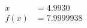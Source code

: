 \documentclass[preview]{standalone}
\begin{document}
\begin{align*}
x &= 4.9930\\f(x) &= 7.9999938
\end{align*}
\end{document}
